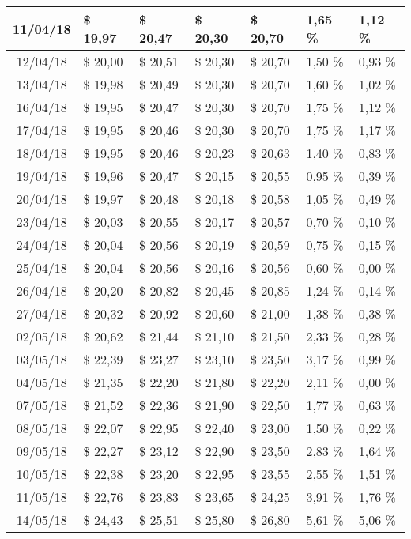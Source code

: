\begin{center}
\begin{longtable}{|c|p{1.5cm}|p{1.5cm}|p{1.5cm}|p{1.5cm}|p{1.5cm}|p{1.5cm}|}
11/04/18 & \$ 19,97 & \$ 20,47 & \$ 20,30 & \$ 20,70 & 1,65 \% & 1,12 \% \\ \hline
12/04/18 & \$ 20,00 & \$ 20,51 & \$ 20,30 & \$ 20,70 & 1,50 \% & 0,93 \% \\ \hline
13/04/18 & \$ 19,98 & \$ 20,49 & \$ 20,30 & \$ 20,70 & 1,60 \% & 1,02 \% \\ \hline
16/04/18 & \$ 19,95 & \$ 20,47 & \$ 20,30 & \$ 20,70 & 1,75 \% & 1,12 \% \\ \hline
17/04/18 & \$ 19,95 & \$ 20,46 & \$ 20,30 & \$ 20,70 & 1,75 \% & 1,17 \% \\ \hline
18/04/18 & \$ 19,95 & \$ 20,46 & \$ 20,23 & \$ 20,63 & 1,40 \% & 0,83 \% \\ \hline
19/04/18 & \$ 19,96 & \$ 20,47 & \$ 20,15 & \$ 20,55 & 0,95 \% & 0,39 \% \\ \hline
20/04/18 & \$ 19,97 & \$ 20,48 & \$ 20,18 & \$ 20,58 & 1,05 \% & 0,49 \% \\ \hline
23/04/18 & \$ 20,03 & \$ 20,55 & \$ 20,17 & \$ 20,57 & 0,70 \% & 0,10 \% \\ \hline
24/04/18 & \$ 20,04 & \$ 20,56 & \$ 20,19 & \$ 20,59 & 0,75 \% & 0,15 \% \\ \hline
25/04/18 & \$ 20,04 & \$ 20,56 & \$ 20,16 & \$ 20,56 & 0,60 \% & 0,00 \% \\ \hline
26/04/18 & \$ 20,20 & \$ 20,82 & \$ 20,45 & \$ 20,85 & 1,24 \% & 0,14 \% \\ \hline
27/04/18 & \$ 20,32 & \$ 20,92 & \$ 20,60 & \$ 21,00 & 1,38 \% & 0,38 \% \\ \hline
02/05/18 & \$ 20,62 & \$ 21,44 & \$ 21,10 & \$ 21,50 & 2,33 \% & 0,28 \% \\ \hline
03/05/18 & \$ 22,39 & \$ 23,27 & \$ 23,10 & \$ 23,50 & 3,17 \% & 0,99 \% \\ \hline
04/05/18 & \$ 21,35 & \$ 22,20 & \$ 21,80 & \$ 22,20 & 2,11 \% & 0,00 \% \\ \hline
07/05/18 & \$ 21,52 & \$ 22,36 & \$ 21,90 & \$ 22,50 & 1,77 \% & 0,63 \% \\ \hline
08/05/18 & \$ 22,07 & \$ 22,95 & \$ 22,40 & \$ 23,00 & 1,50 \% & 0,22 \% \\ \hline
09/05/18 & \$ 22,27 & \$ 23,12 & \$ 22,90 & \$ 23,50 & 2,83 \% & 1,64 \% \\ \hline
10/05/18 & \$ 22,38 & \$ 23,20 & \$ 22,95 & \$ 23,55 & 2,55 \% & 1,51 \% \\ \hline
11/05/18 & \$ 22,76 & \$ 23,83 & \$ 23,65 & \$ 24,25 & 3,91 \% & 1,76 \% \\ \hline
14/05/18 & \$ 24,43 & \$ 25,51 & \$ 25,80 & \$ 26,80 & 5,61 \% & 5,06 \% \\ \hline

\end{longtable}
\end{center}
